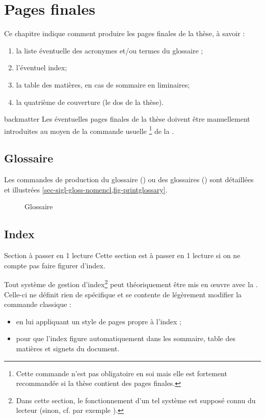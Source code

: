 \chapter{Pages finales}\label{cha-pages-finales}

Ce chapitre indique comment produire les pages finales de la thèse,
à savoir :
\begin{enumerate}
\item la liste éventuelle des acronymes et/ou
  termes du glossaire ;
\item l'éventuel index;
\item la table des matières, en cas de sommaire en \glspl{liminaire};
\item la quatrième de couverture (le dos de la thèse).
\end{enumerate}

\begin{docCommand}{backmatter}{}
  Les éventuelles pages finales de la thèse doivent être manuellement
  introduites au moyen de la commande usuelle
  \footnote{Cette commande n'est pas obligatoire en
    soi mais elle est fortement recommandée si la thèse contient des pages
    finales.} de la \nofrontmatter.
\end{docCommand}

\section{Glossaire}

Les commandes de production du glossaire () ou
des glossaires () sont détaillées et illustrées
\vref{sec-sigl-gloss-nomencl,fig-printglossary}.

\begin{figure}[htbp]
  \centering
  \caption{Glossaire}
  \label{fig-printglossary}
\end{figure}

\section{Index}

\begin{dbremark*}{Section à passer en 1\iere{} lecture}
  Cette section est à passer en 1\iere{} lecture si on ne compte pas faire
  figurer d'index.
\end{dbremark*}

Tout système de gestion d'index\footnote{Dans cette section, le fonctionnement
  d'un tel système est supposé connu du lecteur (sinon, cf. par exemple
  \cite{en-ligne7}).} peut théoriquement être mis en œuvre avec la
\yatcl. Celle-ci ne définit rien de spécifique et se contente de légèrement
modifier la commande  classique :
\begin{itemize}
\item en lui appliquant un style de pages propre à l'index ;
\item pour que l'index figure automatiquement dans les
  sommaire, table des matières et signets du document.
\end{itemize}

